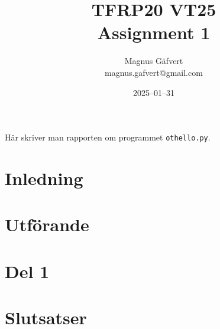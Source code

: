 \documentclass[a4paper]{article}
\title{TFRP20 VT25\\ Assignment 1}
\author{Magnus Gäfvert\\magnus.gafvert@gmail.com}
\date{2025--01--31}
\begin{document}
\maketitle
Här skriver man rapporten om programmet \texttt{othello.py}.
\section{Inledning}
\section{Utförande}
\section{Del 1}
\section{Slutsatser}
\end{document}
